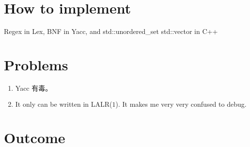 \documentclass[12pt,a4paper]{article}
\begin{document}
\begin{CJK}{UTF8}{bsmi}
    \section{How to implement}
    Regex in Lex, BNF in Yacc, and std::unordered\_set std::vector in C++

    \section{Problems}
    \begin{enumerate}
        \item Yacc 有毒。
        \item It only can be written in LALR($1$). It makes me very very confused to debug.
    \end{enumerate}

    \section{Outcome}
    

\end{CJK}
\end{document}
